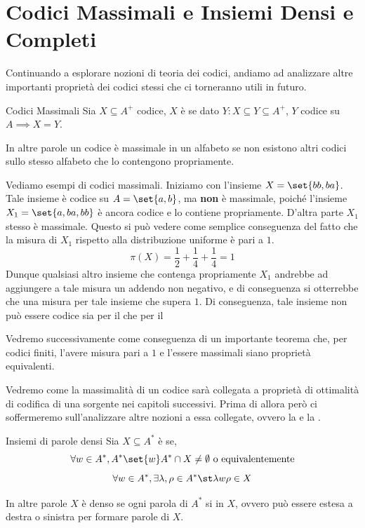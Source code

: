 \section{Codici Massimali e Insiemi Densi e Completi}

Continuando a esplorare nozioni di teoria dei codici, andiamo ad analizzare altre importanti proprietà dei codici stessi che ci torneranno utili in futuro.

\begin{definition}{Codici Massimali}
  Sia \(X \subseteq A^+\) codice, \(X\) è  se dato \(Y: X\subseteq Y \subseteq A^+\), \(Y\) codice su \(A \implies X = Y\).

  In altre parole un codice è massimale in un alfabeto se non esistono altri codici sullo stesso alfabeto che lo contengono propriamente.
\end{definition}

\begin{example}{}
  Vediamo esempi di codici massimali.
  Iniziamo con l'insieme \(X = \set{bb,ba}\). Tale insieme è codice su \(A = \set{a,b}\), ma \textbf{non} è massimale, poiché l'insieme \(X_1 = \set{a,ba,bb}\) è ancora codice e lo contiene propriamente.
  D'altra parte \(X_1\) stesso è massimale. Questo si può vedere come semplice conseguenza del fatto che la misura di \(X_1\) rispetto alla distribuzione uniforme è pari a \(1\).
  \[\pi(X) = \frac{1}{2} + \frac{1}{4} + \frac{1}{4} = 1\]
  Dunque qualsiasi altro insieme che contenga propriamente \(X_1\) andrebbe ad aggiungere a tale misura un addendo non negativo, e di conseguenza si otterrebbe che una misura per tale insieme che supera \(1\).
  Di conseguenza, tale insieme non può essere codice sia per il  che per il 

  Vedremo successivamente come conseguenza di un importante teorema che, per codici finiti, l'avere misura pari a \(1\) e l'essere massimali siano proprietà equivalenti.
\end{example}

Vedremo come la massimalità di un codice sarà collegata a proprietà di ottimalità di codifica di una sorgente nei capitoli successivi.
Prima di allora però ci soffermeremo sull'analizzare altre nozioni a essa collegate, ovvero la  e la .

\begin{definition}{Insiemi di parole densi}
  Sia \(X \subseteq A^*\) è  se, 
  \[\forall w \in A^*,A^*\set{w}A^* \cap X \neq \emptyset \text{ o equivalentemente}\]
  \[\forall w \in A^*, \exists \lambda,\rho\in A^* \st \lambda w \rho \in X\]

  In altre parole \(X\) è denso se ogni parola di \(A^*\) si  in \(X\), ovvero può essere estesa a destra o sinistra per formare parole di \(X\).
\end{definition}

